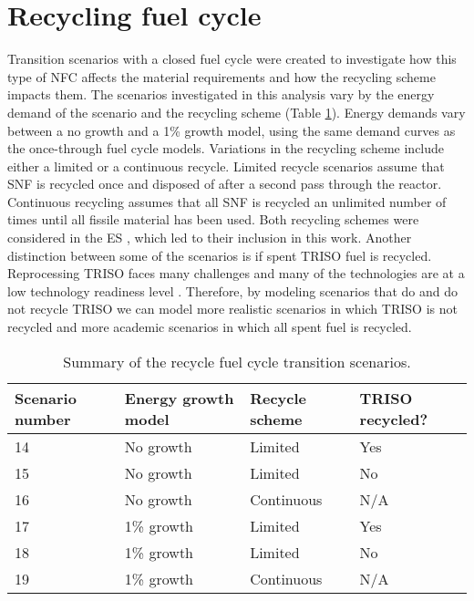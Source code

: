 \section{Recycling fuel cycle}\label{sec:recycle-methods}
Transition scenarios with a closed fuel cycle were created
to investigate how this type of \gls{NFC} affects the material requirements 
and how the recycling scheme impacts them. The scenarios investigated in 
this analysis vary by the energy demand of the scenario and the recycling 
scheme (Table \ref{tab:scenarios_recycle}). Energy demands vary 
between a no growth and a 1\% growth model, using the same 
demand curves as the once-through 
fuel cycle models. Variations in the recycling 
scheme include either a limited or a continuous recycle. Limited recycle 
scenarios assume that \gls{SNF} is recycled once and disposed of after a 
second pass through the reactor. Continuous recycling assumes that all 
\gls{SNF} is recycled an unlimited number of times until all fissile 
material has been used. Both recycling schemes were considered in the 
\acrfull{ES} \cite{wigeland_nuclear_2014}, which led to their inclusion 
in this work. Another distinction between some of the 
scenarios is if spent \gls{TRISO} fuel is recycled. Reprocessing \gls{TRISO}
faces many challenges and many of the technologies are at a low technology 
readiness level \cite{arm_plan_2022,kiegiel_management_2022}.
Therefore, by modeling scenarios that do and do not recycle 
\gls{TRISO} we can model more realistic scenarios in which \gls{TRISO} 
is not recycled and more academic scenarios in which all spent fuel is 
recycled. 

\begin{table}[ht]
    \centering
    \caption{Summary of the recycle fuel cycle transition scenarios.}
    \label{tab:scenarios_recycle}
    \begin{tabular}{l l l l}
            \hline
            Scenario number & Energy growth model & Recycle scheme & \gls{TRISO} recycled?\\
            \hline
            14 & No growth & Limited & Yes\\
            15 & No growth & Limited & No\\
            16 & No growth & Continuous & N/A \\
            17 & 1\% growth & Limited & Yes\\
            18 & 1\% growth & Limited & No\\
            19 & 1\% growth & Continuous & N/A \\
            \hline
    \end{tabular}
\end{table}

